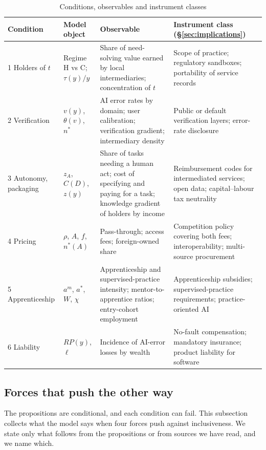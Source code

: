 \documentclass[12pt]{article}
\theoremstyle{remark}
\begin{document}
\begin{table}[t]\centering\small
\caption{Conditions, observables and instrument classes}\label{tab:conditions}
\begin{tabular}{p{}p{}p{}p{}}
\toprule
Condition & Model object & Observable & Instrument class (\S\ref{sec:implications})\\
\midrule
1 Holders of $t$ & Regime H vs C; $\tau(y)/y$ & Share of need-solving value earned by local intermediaries; concentration of $t$ & Scope of practice; regulatory sandboxes; portability of service records\\
2 Verification & $v(y)$, $\theta(v)$, $n^*$ & AI error rates by domain; user calibration; verification gradient; intermediary density & Public or default verification layers; error-rate disclosure\\
3 Autonomy, packaging & $z_A$, $C(D)$, $z(y)$ & Share of tasks needing a human act; cost of specifying and paying for a task; knowledge gradient of holders by income & Reimbursement codes for intermediated services; open data; capital--labour tax neutrality\\
4 Pricing & $\rho$, $A$, $f$, $n^*(A)$ & Pass-through; access fees; foreign-owned share & Competition policy covering both fees; interoperability; multi-source procurement\\
5 Apprenticeship & $a^m$, $a^*$, $W$, $\chi$ & Apprenticeship and supervised-practice intensity; mentor-to-apprentice ratios; entry-cohort employment & Apprenticeship subsidies; supervised-practice requirements; practice-oriented AI\\
6 Liability & $RP(y)$, $\ell$ & Incidence of AI-error losses by wealth & No-fault compensation; mandatory insurance; product liability for software\\
\bottomrule
\end{tabular}
\end{table}

\subsection{Forces that push the other way}\label{sec:counter}

The propositions are conditional, and each condition can fail. This subsection collects what the model says when four forces push against inclusiveness. We state only what follows from the propositions or from sources we have read, and we name which.
\end{document}
